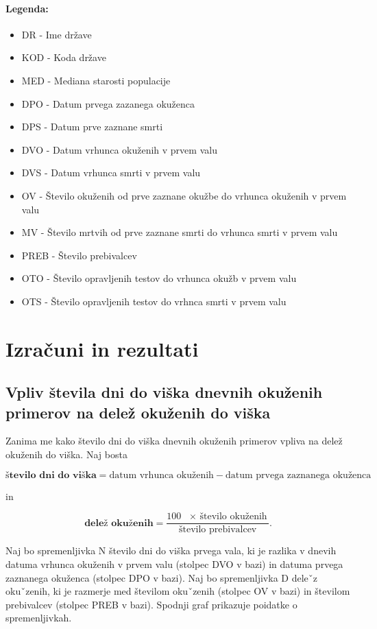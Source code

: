 \documentclass[a4paper,11pt]{article}
\begin{document}
\paragraph{Legenda:}

\begin{itemize}
\item{DR - Ime države}
\item{KOD - Koda države}
\item{MED - Mediana starosti populacije}
\item{DPO - Datum prvega zazanega okuženca}
\item{DPS - Datum prve zaznane smrti}
\item{DVO - Datum vrhunca okuženih v prvem valu}
\item{DVS - Datum vrhunca smrti v prvem valu}
\item{OV - Število okuženih od prve zaznane okužbe do vrhunca okuženih v prvem valu}
\item{MV - Število mrtvih od prve zaznane smrti do vrhunca smrti v prvem valu}
\item{PREB - Število prebivalcev}
\item{OTO - Število opravljenih testov do vrhunca okužb v prvem valu}
\item{OTS - Število opravljenih testov do vrhnca smrti v prvem valu}
\end{itemize}

\section{Izračuni in rezultati}

\subsection{Vpliv števila dni do viška dnevnih okuženih primerov na delež okuženih do viška}
Zanima me kako število dni do viška dnevnih okuženih primerov vpliva na delež okuženih do viška. Naj bosta
\begin{center}
\[\textbf{število dni do viška} = \text{datum vrhunca okuženih} - \text{datum prvega zaznanega okuženca}\]
\end{center}  in 

\begin{center}
\[\textbf{delež okuženih} = \frac{100 \text{ \(\times\) število okuženih}}{\text{število prebivalcev}}.\]
\end{center} 

Naj bo spremenljivka N število dni do viška prvega vala, ki je razlika v dnevih datuma vrhunca okuženih v prvem valu (stolpec DVO v bazi) in datuma prvega zaznanega okuženca (stolpec DPO v bazi).  Naj bo spremenljivka D deleˇz okuˇzenih, ki je razmerje med številom okuˇzenih (stolpec OV v bazi) in številom prebivalcev (stolpec PREB v bazi). Spodnji graf prikazuje poidatke o spremenljivkah.
\end{document}

